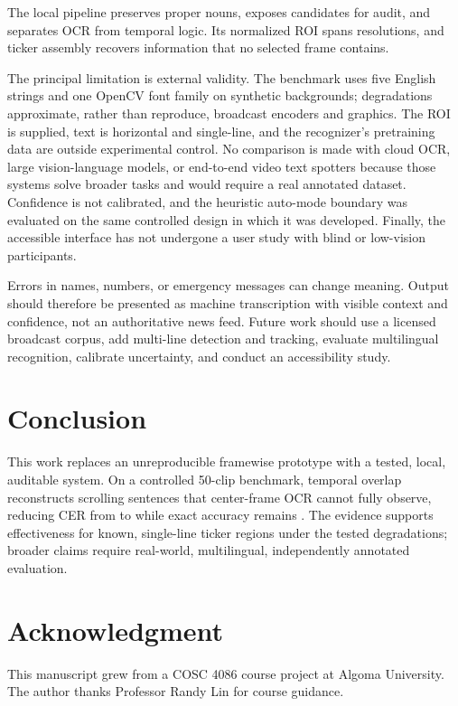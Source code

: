 \documentclass[conference]{IEEEtran}
\begin{document}
The local pipeline preserves proper nouns, exposes candidates for audit, and separates OCR from
temporal logic.  Its normalized ROI spans resolutions, and ticker assembly recovers information
that no selected frame contains.

The principal limitation is external validity.  The benchmark uses five English strings and one
OpenCV font family on synthetic backgrounds; degradations approximate, rather than reproduce,
broadcast encoders and graphics.  The ROI is supplied, text is horizontal and single-line, and
the recognizer's pretraining data are outside experimental control.  No comparison is made with
cloud OCR, large vision-language models, or end-to-end video text spotters because those systems
solve broader tasks and would require a real annotated dataset.  Confidence is not calibrated,
and the heuristic auto-mode boundary was evaluated on the same controlled design in which it was
developed.  Finally, the accessible interface has not undergone a user study with blind or
low-vision participants.

Errors in names, numbers, or emergency messages can change meaning.  Output should therefore be
presented as machine transcription with visible context and confidence, not an authoritative news
feed.  Future work should use a licensed broadcast corpus, add multi-line detection and tracking,
evaluate multilingual recognition, calibrate uncertainty, and conduct an accessibility study.

\section{Conclusion}

This work replaces an unreproducible framewise prototype with a tested, local, auditable system.
On a controlled 50-clip benchmark, temporal overlap reconstructs scrolling sentences that
center-frame OCR cannot fully observe, reducing CER from \BaselineCER{} to \TemporalCER{} while
exact accuracy remains \TemporalExact{}.  The evidence supports effectiveness for known,
single-line ticker regions under the tested degradations; broader claims require real-world,
multilingual, independently annotated evaluation.

\section*{Acknowledgment}

This manuscript grew from a COSC 4086 course project at Algoma University.  The author thanks
Professor Randy Lin for course guidance.

\balance


\end{document}
